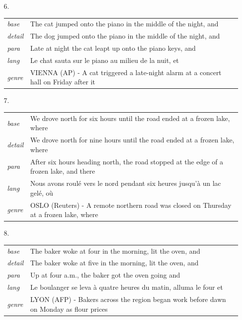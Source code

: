 \documentclass[11pt]{article}
\theoremstyle{definition}
\theoremstyle{remark}
\begin{document}
{\begin{itemize}
\item[6.] \begin{tabular}[t]{@{}ll@{}}\emph{base} & \parbox[t]{0.78\linewidth}{The cat jumped onto the piano in the middle of the night, and}\\\emph{detail} & \parbox[t]{0.78\linewidth}{The dog jumped onto the piano in the middle of the night, and}\\\emph{para} & \parbox[t]{0.78\linewidth}{Late at night the cat leapt up onto the piano keys, and}\\\emph{lang} & \parbox[t]{0.78\linewidth}{Le chat sauta sur le piano au milieu de la nuit, et}\\\emph{genre} & \parbox[t]{0.78\linewidth}{VIENNA (AP) - A cat triggered a late-night alarm at a concert hall on Friday after it}\\\end{tabular}
\item[7.] \begin{tabular}[t]{@{}ll@{}}\emph{base} & \parbox[t]{0.78\linewidth}{We drove north for six hours until the road ended at a frozen lake, where}\\\emph{detail} & \parbox[t]{0.78\linewidth}{We drove north for nine hours until the road ended at a frozen lake, where}\\\emph{para} & \parbox[t]{0.78\linewidth}{After six hours heading north, the road stopped at the edge of a frozen lake, and there}\\\emph{lang} & \parbox[t]{0.78\linewidth}{Nous avons roulé vers le nord pendant six heures jusqu'à un lac gelé, où}\\\emph{genre} & \parbox[t]{0.78\linewidth}{OSLO (Reuters) - A remote northern road was closed on Thursday at a frozen lake, where}\\\end{tabular}
\item[8.] \begin{tabular}[t]{@{}ll@{}}\emph{base} & \parbox[t]{0.78\linewidth}{The baker woke at four in the morning, lit the oven, and}\\\emph{detail} & \parbox[t]{0.78\linewidth}{The baker woke at five in the morning, lit the oven, and}\\\emph{para} & \parbox[t]{0.78\linewidth}{Up at four a.m., the baker got the oven going and}\\\emph{lang} & \parbox[t]{0.78\linewidth}{Le boulanger se leva à quatre heures du matin, alluma le four et}\\\emph{genre} & \parbox[t]{0.78\linewidth}{LYON (AFP) - Bakers across the region began work before dawn on Monday as flour prices}\\\end{tabular}

\end{itemize}}
\end{document}
